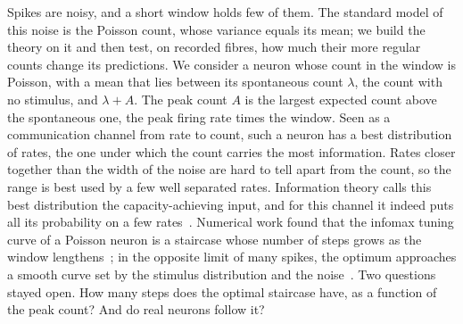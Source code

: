 \documentclass[10pt,letterpaper]{article}
\begin{document}
Spikes are noisy, and a short window holds few of them. The standard model of this noise is the Poisson count, whose variance
equals its mean; we build the theory on it and then test, on recorded fibres, how much their more regular counts change its
predictions. We consider a neuron whose count in the window is Poisson, with a mean that
lies between its spontaneous count $\lambda$, the count with no stimulus, and $\lambda+A$. The peak count $A$ is the largest
expected count above the spontaneous one, the peak firing rate times the window. Seen as a communication channel from rate to count,
such a neuron has a best distribution of rates, the one under which the count carries the most information. Rates closer together
than the width of the noise are hard to tell apart from the count, so the range is best used by a few well separated rates.
Information theory calls this best distribution the capacity-achieving input, and for this channel it indeed puts all its probability
on a few rates~\cite{Shamai1990}. Numerical work found that the infomax tuning curve of a
Poisson neuron is a staircase whose number of steps grows as the window lengthens~\cite{Nikitin2009}; in the opposite limit of many
spikes, the optimum approaches a smooth curve set by the stimulus distribution and the noise~\cite{McDonnellStocks2008}. Two questions
stayed open. How many steps does the optimal staircase have, as a function of the peak count? And do real neurons follow it?
\end{document}
